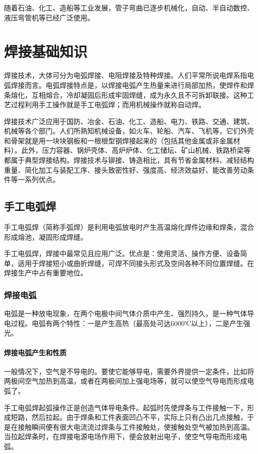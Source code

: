 \documentclass{ctexbook}
\begin{document}
随着石油、化工、造船等工业发展，管子弯曲已逐步机械化，自动、半自动数控、液压弯管机等已经广泛使用。
\chapter{焊接基础知识}
焊接技术，大体可分为电弧焊接、电阻焊接及特种焊接。人们平常所说电焊系指电弧焊接而言。电弧焊接特点是，以焊接电弧产生热量来进行局部加热，使焊件和焊条熔化，互相熔合，冷却凝固后形成牢固焊缝，成为永久且不可拆卸联接。这种工艺过程利用手工操作就是手工电弧焊；而用机械操作就称自动焊。

焊接技术广泛应用于国防、冶金、石油、化工、造船、电力、铁路、交通、建筑、机械等各个部门。人们所熟知机械设备，如火车、轮船、汽车、飞机等，它们外壳和骨架就是用一块块钢板和一根根型钢焊接起来的（包括其他金属或非金属材料）。此外，压力容器、锅炉壳体、高炉炉体、化工储坛、矿山机械、铁路桥梁等都属于典型焊接结构。焊接技术与铆接、铸造相比，具有节省金属材料、减轻结构重量、简化加工与装配工序、接头致密性好、强度高、经济效益好、能改善劳动条件等一系列优点。
\section{手工电弧焊}
手工电弧焊（简称手弧焊）是利用电弧放电时产生高温熔化焊件边缘和焊条，混合形成熔池，凝固形成焊缝。

手工电弧焊，焊接中最常见且应用广泛。优点是：使用灵活、操作方便、设备简单，适用于焊接短小或曲折焊缝，可焊不同接头形式及空间各种不同位置焊缝。在焊接生产中占有重要地位。
\subsection{焊接电弧}
电弧是一种放电现象，在两个电极中间气体介质中产生、强烈持久，是一种气体导电过程。电弧有两个特性：一是产生高热（最高处可达6000℃以上），二是产生强光。
\subsubsection{焊接电弧产生和性质}
一般情况下，空气是不导电的。要使它能够导电，需要外界提供一定条件，比如将两极间空气加热到高温，或者在两极间加上强电场等，就可以使空气导电而形成电弧了。

手工电弧焊起弧操作正是创造气体导电条件。起弧时先使焊条与工件接触一下，形成短路，然后拉起。由于焊条和工件表面凹凸不平，实际上只有凸出几点接触，于是在接触瞬间便有很大电流流过焊条与工件接触处，使接触处空气被加热到高温。当拉起焊条时，在焊接电源电场作用下，便会放射出电子，使空气导电而形成电弧。
\end{document}
